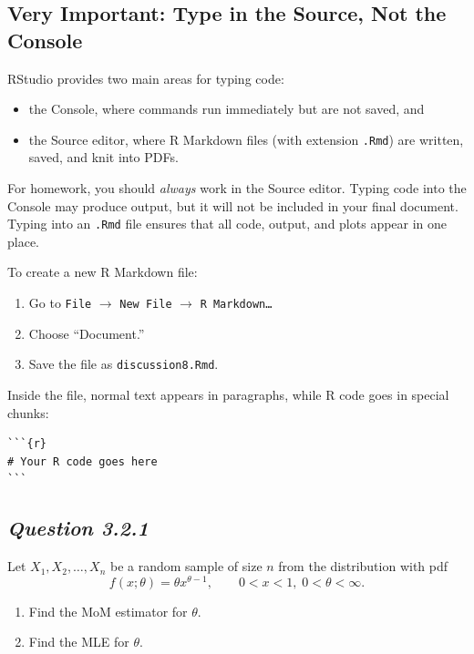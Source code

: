 \documentclass[11pt,letterpaper]{article}
\theoremstyle{remark}
\begin{document}
\subsection*{Very Important: Type in the Source, Not the Console}

RStudio provides two main areas for typing code:

\begin{itemize}
    \item the Console, where commands run immediately but are not saved, and
    \item the Source editor, where R Markdown files (with extension \texttt{.Rmd}) are written, saved, and knit into PDFs.
\end{itemize}

For homework, you should \emph{always} work in the Source editor. Typing code into the Console may produce output, but it will not be included in your final document. Typing into an \texttt{.Rmd} file ensures that all code, output, and plots appear in one place.

To create a new R Markdown file:

\begin{enumerate}
    \item Go to \texttt{File} $\rightarrow$ \texttt{New File} $\rightarrow$ \texttt{R Markdown\ldots}
    \item Choose ``Document.''
    \item Save the file as \texttt{discussion8.Rmd}.
\end{enumerate}

Inside the file, normal text appears in paragraphs, while R code goes in special chunks:

\begin{verbatim}
```{r}
# Your R code goes here
```
\end{verbatim}


\newpage

\subsection*{\textit{Question 3.2.1}}

Let $X_1, X_2, \ldots, X_n$ be a random sample of size $n$ from the distribution with pdf
\[
f(x;\theta) = \theta x^{\theta - 1}, \qquad 0 < x < 1,\; 0 < \theta < \infty.
\]

\begin{enumerate}
    \item[(a)] Find the MoM estimator for $\theta$.
    \item[(b)] Find the MLE for $\theta$.
\end{enumerate}
\end{document}
